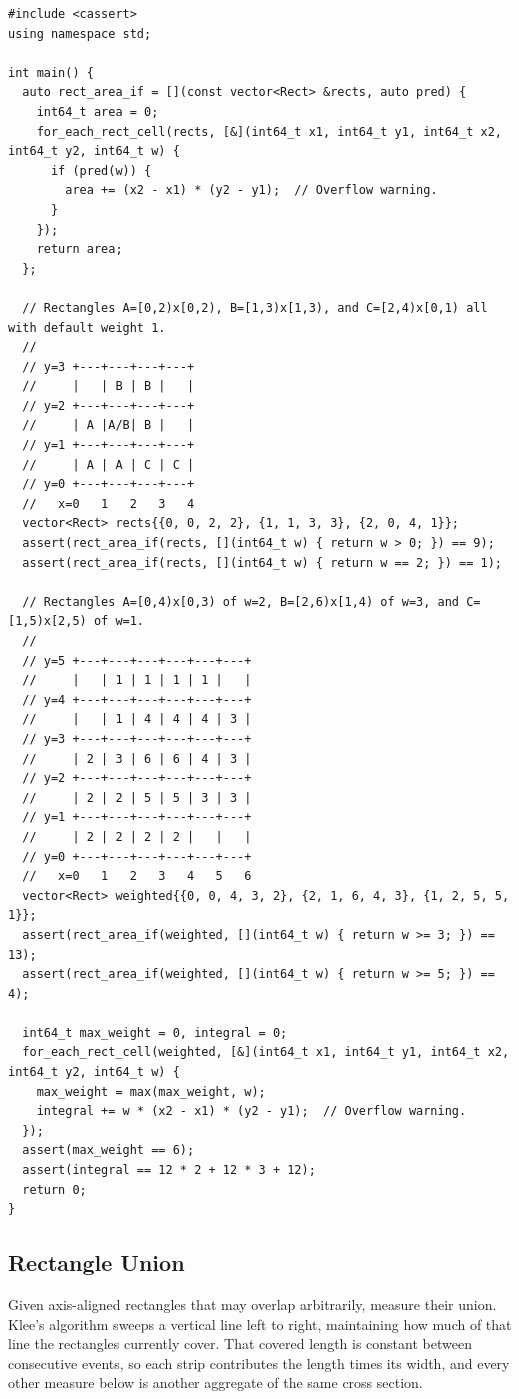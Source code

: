 \begin{lstlisting}[style=cpp]
#include <cassert>
using namespace std;

int main() {
  auto rect_area_if = [](const vector<Rect> &rects, auto pred) {
    int64_t area = 0;
    for_each_rect_cell(rects, [&](int64_t x1, int64_t y1, int64_t x2, int64_t y2, int64_t w) {
      if (pred(w)) {
        area += (x2 - x1) * (y2 - y1);  // Overflow warning.
      }
    });
    return area;
  };

  // Rectangles A=[0,2)x[0,2), B=[1,3)x[1,3), and C=[2,4)x[0,1) all with default weight 1.
  //
  // y=3 +---+---+---+---+
  //     |   | B | B |   |
  // y=2 +---+---+---+---+
  //     | A |A/B| B |   |
  // y=1 +---+---+---+---+
  //     | A | A | C | C |
  // y=0 +---+---+---+---+
  //   x=0   1   2   3   4
  vector<Rect> rects{{0, 0, 2, 2}, {1, 1, 3, 3}, {2, 0, 4, 1}};
  assert(rect_area_if(rects, [](int64_t w) { return w > 0; }) == 9);
  assert(rect_area_if(rects, [](int64_t w) { return w == 2; }) == 1);

  // Rectangles A=[0,4)x[0,3) of w=2, B=[2,6)x[1,4) of w=3, and C=[1,5)x[2,5) of w=1.
  //
  // y=5 +---+---+---+---+---+---+
  //     |   | 1 | 1 | 1 | 1 |   |
  // y=4 +---+---+---+---+---+---+
  //     |   | 1 | 4 | 4 | 4 | 3 |
  // y=3 +---+---+---+---+---+---+
  //     | 2 | 3 | 6 | 6 | 4 | 3 |
  // y=2 +---+---+---+---+---+---+
  //     | 2 | 2 | 5 | 5 | 3 | 3 |
  // y=1 +---+---+---+---+---+---+
  //     | 2 | 2 | 2 | 2 |   |   |
  // y=0 +---+---+---+---+---+---+
  //   x=0   1   2   3   4   5   6
  vector<Rect> weighted{{0, 0, 4, 3, 2}, {2, 1, 6, 4, 3}, {1, 2, 5, 5, 1}};
  assert(rect_area_if(weighted, [](int64_t w) { return w >= 3; }) == 13);
  assert(rect_area_if(weighted, [](int64_t w) { return w >= 5; }) == 4);

  int64_t max_weight = 0, integral = 0;
  for_each_rect_cell(weighted, [&](int64_t x1, int64_t y1, int64_t x2, int64_t y2, int64_t w) {
    max_weight = max(max_weight, w);
    integral += w * (x2 - x1) * (y2 - y1);  // Overflow warning.
  });
  assert(max_weight == 6);
  assert(integral == 12 * 2 + 12 * 3 + 12);
  return 0;
}
\end{lstlisting}
\subsection{Rectangle Union}
\label{sec:7.3.9}
Given axis-aligned rectangles that may overlap arbitrarily, measure their union. Klee's algorithm sweeps a vertical line left to right, maintaining how much of that line the rectangles currently cover. That covered length is constant between consecutive events, so each strip contributes the length times its width, and every other measure below is another aggregate of the same cross section.

